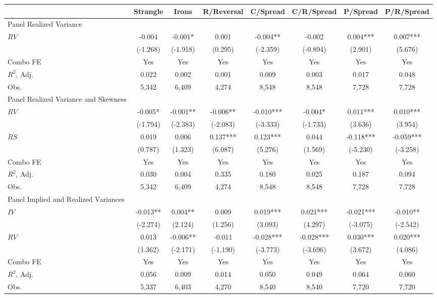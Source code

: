 \begin{tabular}{lccccccc}
\toprule
 & Strangle & Irons & R/Reversal & C/Spread & C/R/Spread & P/Spread & P/R/Spread \\
\midrule
Panel Realized Variance &  &  &  &  &  &  &  \\
$RV$ & -0.004 & -0.001* & 0.001 & -0.004** & -0.002 & 0.004*** & 0.007*** \\
 & (-1.268) & (-1.918) & (0.295) & (-2.359) & (-0.894) & (2.901) & (5.676) \\
Combo FE & Yes & Yes & Yes & Yes & Yes & Yes & Yes \\
$R^2$,  Adj. & 0.022 & 0.002 & 0.001 & 0.009 & 0.003 & 0.017 & 0.048 \\
Obs. & 5,342 & 6,409 & 4,274 & 8,548 & 8,548 & 7,728 & 7,728 \\
Panel Realized Variance and Skewness &  &  &  &  &  &  &  \\
$RV$ & -0.005* & -0.001** & -0.006** & -0.010*** & -0.004* & 0.011*** & 0.010*** \\
 & (-1.794) & (-2.383) & (-2.083) & (-3.333) & (-1.733) & (3.636) & (3.954) \\
$RS$ & 0.019 & 0.006 & 0.137*** & 0.123*** & 0.044 & -0.118*** & -0.059*** \\
 & (0.787) & (1.323) & (6.087) & (5.276) & (1.569) & (-5.230) & (-3.258) \\
Combo FE & Yes & Yes & Yes & Yes & Yes & Yes & Yes \\
$R^2$,  Adj. & 0.030 & 0.004 & 0.335 & 0.180 & 0.025 & 0.187 & 0.094 \\
Obs. & 5,342 & 6,409 & 4,274 & 8,548 & 8,548 & 7,728 & 7,728 \\
Panel Implied and Realized Variances &  &  &  &  &  &  &  \\
$IV$ & -0.013** & 0.004** & 0.009 & 0.019*** & 0.021*** & -0.021*** & -0.010** \\
 & (-2.274) & (2.124) & (1.256) & (3.093) & (4.297) & (-3.075) & (-2.542) \\
$RV$ & 0.013 & -0.006** & -0.011 & -0.028*** & -0.028*** & 0.030*** & 0.020*** \\
 & (1.362) & (-2.171) & (-1.190) & (-3.773) & (-3.696) & (3.672) & (4.086) \\
Combo FE & Yes & Yes & Yes & Yes & Yes & Yes & Yes \\
$R^2$,  Adj. & 0.056 & 0.009 & 0.014 & 0.050 & 0.049 & 0.064 & 0.060 \\
Obs. & 5,337 & 6,403 & 4,270 & 8,540 & 8,540 & 7,720 & 7,720 \\

\end{tabular}
